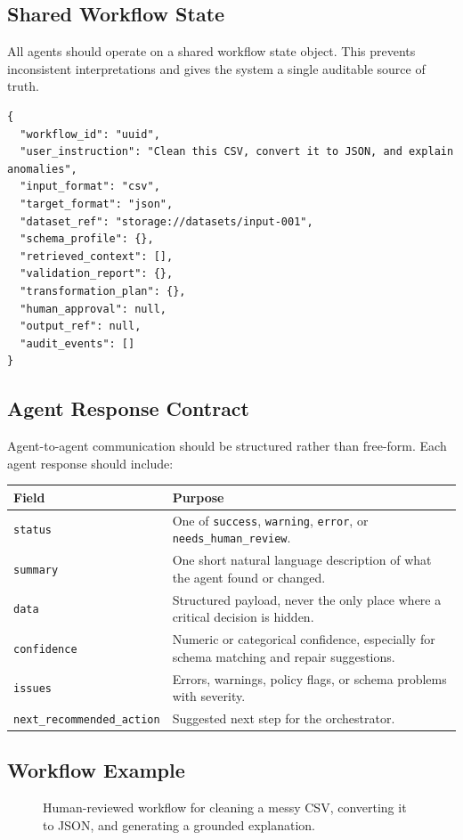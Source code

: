 \subsection{Shared Workflow State}

All agents should operate on a shared workflow state object. This prevents inconsistent interpretations and gives the system a single auditable source of truth.

\begin{verbatim}
{
  "workflow_id": "uuid",
  "user_instruction": "Clean this CSV, convert it to JSON, and explain anomalies",
  "input_format": "csv",
  "target_format": "json",
  "dataset_ref": "storage://datasets/input-001",
  "schema_profile": {},
  "retrieved_context": [],
  "validation_report": {},
  "transformation_plan": {},
  "human_approval": null,
  "output_ref": null,
  "audit_events": []
}
\end{verbatim}

\subsection{Agent Response Contract}

Agent-to-agent communication should be structured rather than free-form. Each agent response should include:

\begin{tabularx}{\textwidth}{p{}X}
\toprule
\textbf{Field} & \textbf{Purpose} \\
\midrule
\texttt{status} & One of \texttt{success}, \texttt{warning}, \texttt{error}, or \texttt{needs\_human\_review}. \\
\texttt{summary} & One short natural language description of what the agent found or changed. \\
\texttt{data} & Structured payload, never the only place where a critical decision is hidden. \\
\texttt{confidence} & Numeric or categorical confidence, especially for schema matching and repair suggestions. \\
\texttt{issues} & Errors, warnings, policy flags, or schema problems with severity. \\
\texttt{next\_recommended\_action} & Suggested next step for the orchestrator. \\
\bottomrule
\end{tabularx}

\subsection{Workflow Example}

\begin{figure}[H]
  \centering
  \resizebox{\textwidth}{!}{}
  \caption{Human-reviewed workflow for cleaning a messy CSV, converting it to JSON, and generating a grounded explanation.}
  \label{fig:workflow}
\end{figure}
